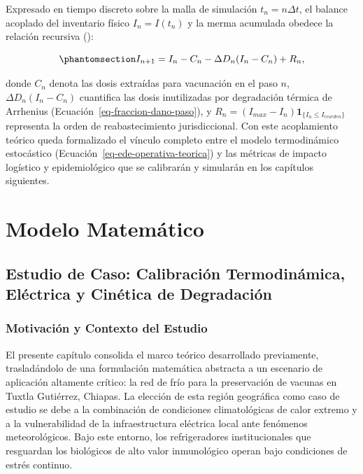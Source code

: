 \documentclass[
  spanish,
  letterpaper,
  DIV=11,
  numbers=noendperiod]{scrreprt}
\theoremstyle{plain}
\theoremstyle{plain}
\theoremstyle{plain}
\theoremstyle{definition}
\theoremstyle{remark}
\begin{document}
Expresado en tiempo discreto sobre la malla de simulación
\(t_n = n\Delta t\), el balance acoplado del inventario físico
\(I_n = I(t_n)\) y la merma acumulada obedece la relación recursiva
():

\begin{equation}\phantomsection\label{eq-balance-inventario-general}{
I_{n+1} = I_n - C_n - \Delta D_n (I_n - C_n) + R_n,
}\end{equation}

donde \(C_n\) denota las dosis extraídas para vacunación en el paso
\(n\), \(\Delta D_n (I_n - C_n)\) cuantifica las dosis inutilizadas por
degradación térmica de Arrhenius (Ecuación~\ref{eq-fraccion-dano-paso}),
y \(R_n = (I_{max} - I_n)\mathbf{1}_{\{I_n \le I_{reorden}\}}\)
representa la orden de reabastecimiento jurisdiccional. Con este
acoplamiento teórico queda formalizado el vínculo completo entre el
modelo termodinámico estocástico
(Ecuación~\ref{eq-ede-operativa-teorica}) y las métricas de impacto
logístico y epidemiológico que se calibrarán y simularán en los
capítulos siguientes.

\part{Modelo Matemático}

\chapter{Estudio de Caso: Calibración Termodinámica, Eléctrica y
Cinética de
Degradación}\label{estudio-de-caso-calibraciuxf3n-termodinuxe1mica-eluxe9ctrica-y-cinuxe9tica-de-degradaciuxf3n}

\section{Motivación y Contexto del
Estudio}\label{sec-motivacion-contexto}

El presente capítulo consolida el marco teórico desarrollado
previamente, trasladándolo de una formulación matemática abstracta a un
escenario de aplicación altamente crítico: la red de frío para la
preservación de vacunas en Tuxtla Gutiérrez, Chiapas. La elección de
esta región geográfica como caso de estudio se debe a la combinación de
condiciones climatológicas de calor extremo y a la vulnerabilidad de la
infraestructura eléctrica local ante fenómenos meteorológicos. Bajo este
entorno, los refrigeradores institucionales que resguardan los
biológicos de alto valor inmunológico operan bajo condiciones de estrés
continuo.
\end{document}
